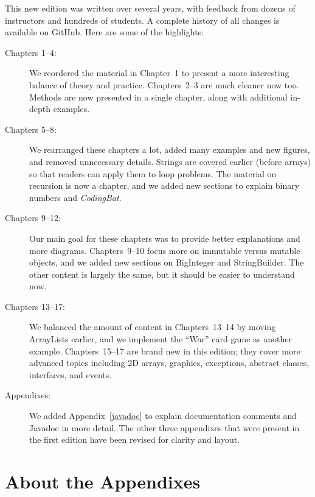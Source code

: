 This new edition was written over several years, with feedback from dozens of instructors and hundreds of students.
A complete history of all changes is available on GitHub.
Here are some of the highlights:

\begin{description}

\item[Chapters 1--4:]
We reordered the material in Chapter~1 to present a more interesting balance of theory and practice.
Chapters~2--3 are much cleaner now too.
Methods are now presented in a single chapter, along with additional in-depth examples.

\item[Chapters 5--8:]
We rearranged these chapters a lot, added many examples and new figures, and removed unnecessary details.
Strings are covered earlier (before arrays) so that readers can apply them to loop problems.
The material on recursion is now a chapter, and we added new sections to explain binary numbers and {\it CodingBat}.

\item[Chapters 9--12:]
Our main goal for these chapters was to provide better explanations and more diagrams.
Chapters~9--10 focus more on immutable versus mutable objects, and we added new sections on BigInteger and StringBuilder.
The other content is largely the same, but it should be easier to understand now.

\item[Chapters 13--17:]
We balanced the amount of content in Chapters~13--14 by moving ArrayLists earlier, and we implement the ``War'' card game as another example.
Chapters~15--17 are brand new in this edition; they cover more advanced topics including 2D arrays, graphics, exceptions, abstract classes, interfaces, and events.

\item[Appendixes:]
We added Appendix~\ref{javadoc} to explain documentation comments and Javadoc in more detail. %
The other three appendixes that were present in the first edition have been revised for clarity and layout.

\end{description}


\section*{About the Appendixes}

